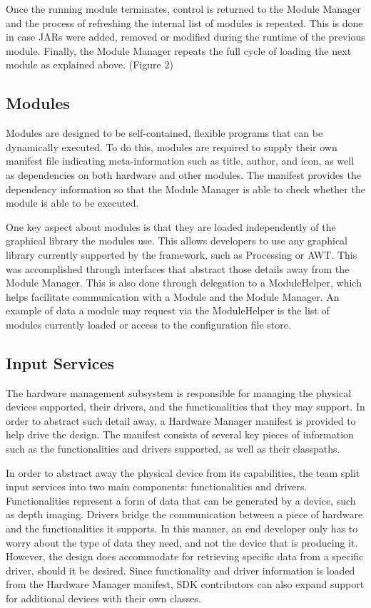 \documentclass[11pt,letterpaper]{article}
\begin{document}
	Once the running module terminates, control is returned to the Module Manager
	and the process of refreshing the internal list of modules is repeated. This
	is done in case JARs were added, removed or modified during the runtime of the
	previous module. Finally, the Module Manager repeats the full cycle of loading
	the next module as explained above.
	(Figure 2)

	\subsection{Modules}

	Modules are designed to be self-contained, flexible programs that can be 
	dynamically executed. To do this, modules are required to supply their own 
	manifest file indicating meta-information such as title, author, and icon, 
	as well as dependencies on both hardware and other modules. The manifest 
	provides the dependency information so that the Module Manager is able to 
	check whether the module is able to be executed.

	One key aspect about modules is that they are loaded independently of the 
	graphical library the modules use. This allows developers to use any 
	graphical library currently supported by the framework, such as Processing 
	or AWT.  This was accomplished through interfaces that abstract those 
	details away from the Module Manager.  This is also done through 
	delegation to a ModuleHelper, which helps facilitate communication with a 
	Module and the Module Manager. An example of data a module may request via 
	the ModuleHelper is the list of modules currently loaded or access to the 
	configuration file store.

	\subsection{Input Services}

	The hardware management subsystem is responsible for managing the physical 
	devices supported, their drivers, and the functionalities that they may 
	support. In order to abstract such detail away, a Hardware Manager 
	manifest is provided to help drive the design. The manifest consists of 
	several key pieces of information such as the functionalities and drivers 
	supported, as well as their classpaths.

	In order to abstract away the physical device from its capabilities, the 
	team split input services into two main components: functionalities and 
	drivers. Functionalities represent a form of data that can be generated by 
	a device, such as depth imaging. Drivers bridge the communication between 
	a piece of hardware and the functionalities it supports. In this manner, 
	an end developer only has to worry about the type of data they need, and 
	not the device that is producing it. However, the design does accommodate 
	for retrieving specific data from a specific driver, should it be desired. 
	Since functionality and driver information is loaded from the Hardware 
	Manager manifest, SDK contributors can also expand support for additional 
	devices with their own classes.
\end{document}
